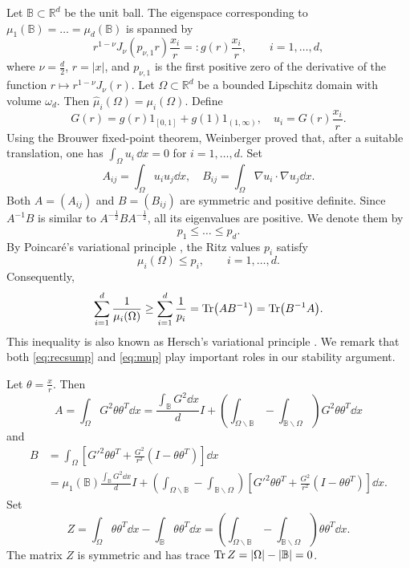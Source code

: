 \documentclass{amsart}
\numberwithin{equation}{section}
\theoremstyle{plain}
\theoremstyle{definition}
\theoremstyle{plain}
\theoremstyle{remark}
\numberwithin{figure}{section}
\newcommand{\B}{\mathbb{B}}
\newcommand{\muu}{\widehat{\mu}}
\begin{document}
Let $\B\subset\mathbb{R}^{d}$ be the unit ball. The eigenspace corresponding to $\mu_1(\B)=\dots=\mu_d(\B)$ is spanned by
\[
    r^{1-\nu}J_\nu(p_{\nu,1}r)\frac{x_i}{r} =:g(r)\frac{x_i}{r}, \qquad i=1,\dots,d,
\]
where $\nu=\frac{d}{2}$, $r=|x|$, and $p_{\nu,1}$ is the first positive zero of the derivative of the function $r\mapsto r^{1-\nu}J_\nu(r)$. Let $\Omega\subset\mathbb{R}^d$ be a bounded Lipschitz domain with volume $\omega_d$. Then $\muu_i(\Omega)=\mu_i(\Omega)$. Define
\[
    G(r)=g(r)1_{[0,1]}+g(1)1_{(1,\infty)}, \quad u_i=G(r)\frac{x_i}{r}.
\]
Using the Brouwer fixed-point theorem, Weinberger \cite{Wein56} proved that, after a suitable translation, one has $\int_\Omega u_i\,\dd x=0$ for $i=1,\dots,d$. Set
\begin{equation}
    \label{eq:defAB}
    A_{ij}= \int_\Omega u_i u_j \dd x, \quad B_{ij}= \int_\Omega \nabla u_i\cdot\nabla u_j \dd x.
\end{equation}
Both $A=(A_{ij})$ and $B=(B_{ij})$ are symmetric and positive definite. Since $A^{-1}B$ is similar to $A^{-\frac12}BA^{-\frac12}$, all its eigenvalues are positive. We denote them by
\[
    p_1\leq\dots\leq p_d.
\]
By Poincaré's variational principle \cite[pp. 259-261]{Poi90}\cite[Chapter II]{PS54}, the Ritz values $p_i$ satisfy
\begin{equation}
    \label{eq:mup}
    \mu_i(\Omega)\leq p_i,
    \qquad i=1,\ldots,d.
\end{equation}
Consequently,
\begin{equation}
    \label{eq:recsump}
    \sum_{i=1}^d \frac{1}{\mu_i(\Omega)}\geq \sum_{i=1}^d \frac{1}{p_i} = \Tr (AB^{-1}) = \Tr (B^{-1}A).
\end{equation}
This inequality is also known as Hersch's variational principle \cite{Her61,HX93}. We remark that both  \cref{eq:recsump} and \cref{eq:mup} play    important roles  in our stability argument.

Let $\theta=\frac{x}{r}$. Then
\begin{equation}
    \label{eq:Aexp}
    A = \int_{\Omega} G^2\theta\theta^T \dd x = \frac{\int_{\B}G^2 \dd x}{d}I + \left(\int_{\Omega\backslash \B}-\int_{\B\backslash\Omega}\right) G^2\theta\theta^T \dd x
\end{equation}
and 
\begin{equation}
    \label{eq:Bexp}
\begin{aligned}
    B & = \int_\Omega [G'^2\theta\theta^T + \frac{G^2}{r^2}(I-\theta\theta^T)] \dd x\\
    & = \mu_1(\B)\frac{\int_{\B}G^2 \dd x}{d}I + \left(\int_{\Omega\backslash \B}-\int_{\B\backslash\Omega}\right)[G'^2\theta\theta^T + \frac{G^2}{r^2}(I-\theta\theta^T)] \dd x.
\end{aligned}
\end{equation}
Set
\begin{equation}
    \label{eq:defZ}
    Z = \int_\Omega \theta\theta^T \dd x - \int_{\B} \theta\theta^T \dd x = \left(\int_{\Omega\backslash\B}-\int_{\B\backslash\Omega}\right) \theta\theta^T \dd x.
\end{equation}
The matrix $Z$ is symmetric and has trace $\Tr Z = |\Omega|-|\B| = 0$.
\end{document}
